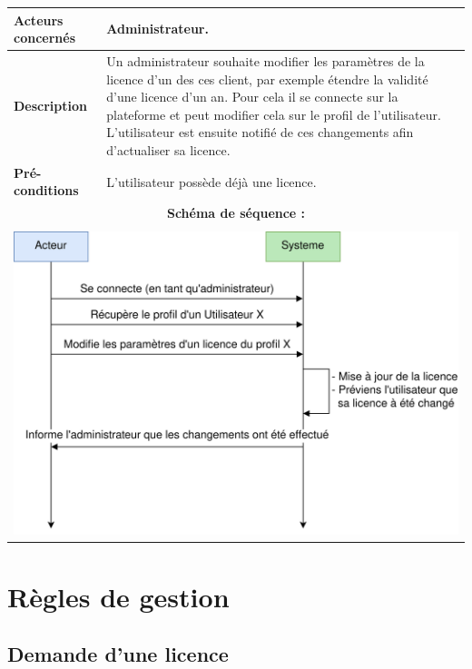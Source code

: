 \begin{table}[!h]
        \centering
        \begin{tabular}{| m{4cm} | m{12cm} |}
                \hline
		    \textbf{Acteurs concernés} & Administrateur. \\
                \hline
		    \textbf{Description} & Un administrateur souhaite modifier les paramètres de la licence d'un des ces client, par exemple étendre la validité d'une licence d'un an. Pour cela il se connecte sur la plateforme et peut modifier cela sur le profil de l'utilisateur. L'utilisateur est ensuite notifié de ces changements afin d'actualiser sa licence.\\
                \hline
		    \textbf{Pré-conditions} & L'utilisateur possède déjà une licence.\\
		\hline
		    \multicolumn{2}{|c|}{\textbf{Schéma de séquence :}} \\
                \hline
                    \multicolumn{2}{|c|}{}\\
                    \multicolumn{2}{|c|}{\includegraphics[width=15cm]{main/png/seq_parametrage.png}} \\
                \hline
        \end{tabular}
        \label{tab:tab5}
\end{table}
\newpage

\section{Règles de gestion}

\subsection{Demande d'une licence}
	
